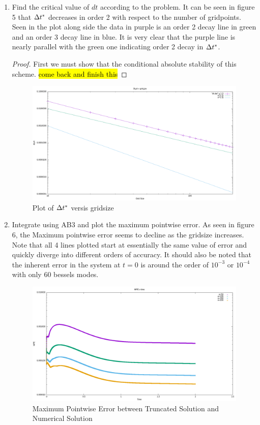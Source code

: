 \documentclass{article}
\begin{document}
\begin{enumerate}[label=\alph*)]
    \item Find the critical value of $dt$ according to the problem. It can be
    seen in figure 5 that $\Delta t^*$ decreases in order 2 with respect to the
    number of gridpoints. Seen in the plot along side the data in purple is an
    order 2 decay line in green and an order 3 decay line in blue. It is very
    clear that the purple line is nearly parallel with the green one indicating
    order 2 decay in $\Delta t^*$. 
        \begin{proof}
            First we must show that the conditional absolute stability of this
            scheme. \hl{come back and finish this}
        \end{proof}
        \begin{figure}[ht]
            \centering
            \includegraphics[width=.8\textwidth]{dt.png}
            \caption{Plot of $\Delta t^*$ versis gridsize}
        \end{figure}

    \item Integrate using AB3 and plot the maximum pointwise error. As seen in
    figure 6, the Maximum pointwise error seems to decline as the gridsize
    increases. Note that all 4 lines plotted start at essentially the same value
    of error and quickly diverge into different orders of accuracy. It should
    also be noted that the inherent error in the system at $t = 0$ is around the order of
    $10^{-3}$ or $10^{-4}$ with only 60 bessels modes.
        \begin{figure}[ht]
            \centering
            \includegraphics[width=.8\textwidth]{mpe.png}
            \caption{Maximum Pointwise Error between Truncated Solution and
            Numerical Solution}
        \end{figure}


\end{enumerate}
\end{document}
